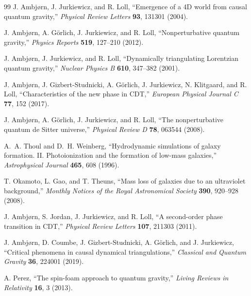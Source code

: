 \documentclass[11pt]{article}
\begin{document}
\begin{thebibliography}{99}
J. Ambj{\o}rn, J. Jurkiewicz, and R. Loll,
``Emergence of a 4D world from causal quantum gravity,''
\emph{Physical Review Letters} \textbf{93}, 131301 (2004).

J. Ambj{\o}rn, A. G{\"o}rlich, J. Jurkiewicz, and R. Loll,
``Nonperturbative quantum gravity,''
\emph{Physics Reports} \textbf{519}, 127--210 (2012).

J. Ambj{\o}rn, J. Jurkiewicz, and R. Loll,
``Dynamically triangulating Lorentzian quantum gravity,''
\emph{Nuclear Physics B} \textbf{610}, 347--382 (2001).

J. Ambj{\o}rn, J. Gizbert-Studnicki, A. G{\"o}rlich, J. Jurkiewicz, N. Klitgaard, and R. Loll,
``Characteristics of the new phase in CDT,''
\emph{European Physical Journal C} \textbf{77}, 152 (2017).

J. Ambj{\o}rn, A. G{\"o}rlich, J. Jurkiewicz, and R. Loll,
``The nonperturbative quantum de Sitter universe,''
\emph{Physical Review D} \textbf{78}, 063544 (2008).

A.~A. Thoul and D.~H. Weinberg,
``Hydrodynamic simulations of galaxy formation. II. Photoionization and the formation of low-mass galaxies,''
\emph{Astrophysical Journal} \textbf{465}, 608 (1996).

T. Okamoto, L. Gao, and T. Theuns,
``Mass loss of galaxies due to an ultraviolet background,''
\emph{Monthly Notices of the Royal Astronomical Society} \textbf{390}, 920--928 (2008).

J. Ambj{\o}rn, S. Jordan, J. Jurkiewicz, and R. Loll,
``A second-order phase transition in CDT,''
\emph{Physical Review Letters} \textbf{107}, 211303 (2011).

J. Ambj{\o}rn, D. Coumbe, J. Gizbert-Studnicki, A. G{\"o}rlich, and J. Jurkiewicz,
``Critical phenomena in causal dynamical triangulations,''
\emph{Classical and Quantum Gravity} \textbf{36}, 224001 (2019).

A. Perez,
``The spin-foam approach to quantum gravity,''
\emph{Living Reviews in Relativity} \textbf{16}, 3 (2013).


\end{thebibliography}
\end{document}
